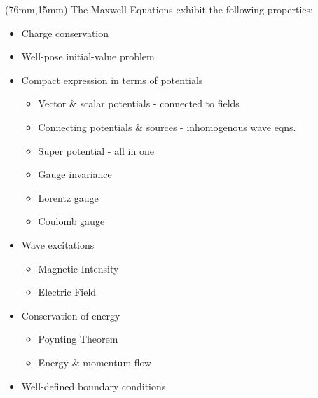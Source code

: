 \begin{textblock*}{50mm}(76mm,15mm)
\tiny
The Maxwell Equations exhibit the following properties:
\begin{itemize} \itemsep1pt \parskip0pt 
\item Charge conservation
\item Well-pose initial-value problem
\item Compact expression in terms of potentials
    \begin{itemize} \itemsep1pt \parskip0pt 
    \item Vector \& scalar potentials - connected to fields
    \item Connecting potentials \& sources - inhomogenous wave eqns.
    \item Super potential - all in one
    \item Gauge invariance
    \item Lorentz gauge
    \item Coulomb gauge
    \end{itemize}
\item Wave excitations
    \begin{itemize} \itemsep1pt \parskip0pt 
    \item Magnetic Intensity
    \item Electric Field
    \end{itemize}
\item Conservation of energy
    \begin{itemize} \itemsep1pt \parskip0pt 
    \item Poynting Theorem
    \item Energy \& momentum flow
    \end{itemize}
\item Well-defined boundary conditions
\end{itemize}
\end{textblock*}

